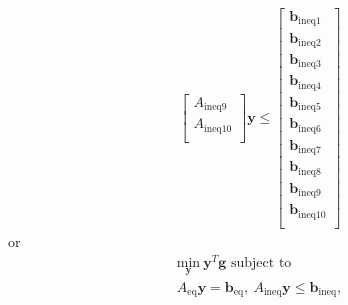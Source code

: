 \begin{equation}
\begin{matrix}
\begin{bmatrix}
		A_{\text{ineq9}} \\
		A_{\text{ineq10}}\\
	 \end{bmatrix}\mathbf{y} \le 
	 \begin{bmatrix}
		\mathbf{b}_{\text{ineq1}} \\
		\mathbf{b}_{\text{ineq2}} \\
		\mathbf{b}_{\text{ineq3}} \\
		\mathbf{b}_{\text{ineq4}} \\
		\mathbf{b}_{\text{ineq5}} \\
		\mathbf{b}_{\text{ineq6}} \\
		\mathbf{b}_{\text{ineq7}} \\
		\mathbf{b}_{\text{ineq8}} \\
		\mathbf{b}_{\text{ineq9}} \\
		\mathbf{b}_{\text{ineq10}}\\
	 \end{bmatrix}
\end{matrix} \end{equation}
or 
\begin{equation}\begin{matrix}
	\underset{\mathbf{y}}{\text{min}} \ \mathbf{y}^T\mathbf{g} \text{ subject to } \\
	A_{\text{eq}}\mathbf{y} = \mathbf{b}_{\text{eq}}, \ A_{\text{ineq}}\mathbf{y} \le \mathbf{b}_{\text{ineq}},
\end{matrix} \end{equation}

